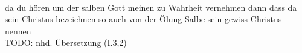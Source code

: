 \begin{exe}
\ex \label{ex:I846} \gll {}                               \\
{da} {du} {hören} {um} {der} {salben} {Gott} {meinen} {} {zu} {Wahrheit} {vernehmen} {dann} {} {dass} {da} {sein} {Christus} {bezeichnen} {} {so} {auch} {von} {der} {Ölung} {Salbe} {sein} {gewiss} {Christus} {nennen} {}\\
\glt TODO: nhd. Übersetzung (I.3,2)
\end{exe}
